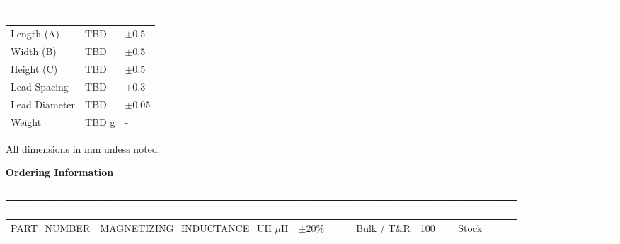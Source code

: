 \documentclass[10pt,a4paper]{article}
\newcommand{\sectiontitle}[1]{%
    \vspace{3mm}%
    {\large\bfseries\color{primary}#1}%
    \vspace{1mm}%
    \hrule height 0.3pt%
    \vspace{2mm}%
}
\begin{document}
\begin{minipage}[t]{0.55\textwidth}
\centering
{}
\end{minipage}
\hfill
\begin{minipage}[t]{0.42\textwidth}
{\footnotesize
\begin{tabular}{|L{20mm}|C{15mm}|C{12mm}|}
\hline
{}
\textcolor{white}{\textbf{Dimension}} & \textcolor{white}{\textbf{Value}} & \textcolor{white}{\textbf{Tol.}} \\
\hline
Length (A) & TBD & $\pm$0.5 \\
Width (B) & TBD & $\pm$0.5 \\
Height (C) & TBD & $\pm$0.5 \\
Lead Spacing & TBD & $\pm$0.3 \\
Lead Diameter & TBD & $\pm$0.05 \\
Weight & TBD g & - \\
\hline
\end{tabular}
}

\vspace{3mm}
{\footnotesize\color{textmuted} All dimensions in mm unless noted.}
\end{minipage}

\vspace{4mm}

\sectiontitle{Ordering Information}

{\footnotesize
\begin{tabular}{|L{35mm}|C{25mm}|C{20mm}|C{25mm}|C{20mm}|C{20mm}|}
\hline
{}
\textcolor{white}{\textbf{Part Number}} & 
\textcolor{white}{\textbf{Inductance}} & 
\textcolor{white}{\textbf{Tolerance}} & 
\textcolor{white}{\textbf{Packaging}} & 
\textcolor{white}{\textbf{MOQ}} &
\textcolor{white}{\textbf{Lead Time}} \\
\hline
{{PART_NUMBER}} & {{MAGNETIZING_INDUCTANCE_UH}} $\mu$H & $\pm$20\% & Bulk / T\&R & 100 & Stock \\
\hline
\end{tabular}
}
\end{document}
